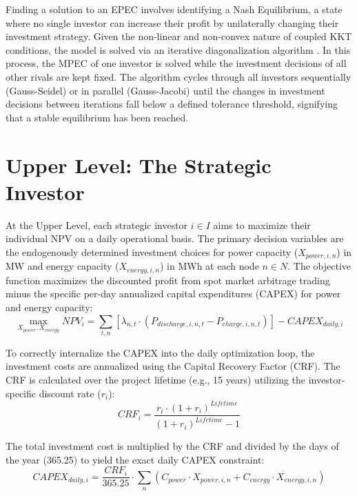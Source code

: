 Finding a solution to an EPEC involves identifying a Nash Equilibrium, a state where no single investor can increase their profit by unilaterally changing their investment strategy. Given the non-linear and non-convex nature of coupled KKT conditions, the model is solved via an iterative diagonalization algorithm \cite{conejo_complementarity_2020}.
In this process, the MPEC of one investor is solved while the investment decisions of all other rivals are kept fixed. The algorithm cycles through all investors sequentially (Gauss-Seidel) or in parallel (Gauss-Jacobi) until the changes in investment decisions between iterations fall below a defined tolerance threshold, signifying that a stable equilibrium has been reached.

\section{Upper Level: The Strategic Investor} \label{sect:Upper_Level}
At the Upper Level, each strategic investor \(i\in I\) aims to maximize their individual NPV on a daily operational basis. The primary decision variables are the endogenously determined investment choices for power capacity (\(X_{power,i,n}\)) in MW and energy capacity (\(X_{energy,i,n}\)) in MWh at each node \(n \in N\).
The objective function maximizes the discounted profit from spot market arbitrage trading minus the specific per-day annualized capital expenditures (CAPEX) for power and energy capacity:
\begin{equation}
        \max_{X_{power}, X_{energy}} NPV_{i} = \sum_{t, n} \left[ \lambda_{n, t} \cdot (P_{discharge, i, n, t} - P_{charge, i, n, t}) \right] - CAPEX_{daily, i}  
\end{equation}

To correctly internalize the CAPEX into the daily optimization loop, the investment costs are annualized using the Capital Recovery Factor (CRF). The CRF is calculated over the project lifetime (e.g., 15 years) utilizing the investor-specific discount rate ($r_i$):
\begin{equation}
    CRF_{i} = \frac{r_i \cdot (1+r_i)^{Lifetime}}{(1+r_i)^{Lifetime} - 1}
\end{equation}

The total investment cost is multiplied by the CRF and divided by the days of the year (365.25) to yield the exact daily CAPEX constraint:
\begin{equation}
    CAPEX_{daily, i} = \frac{CRF_i}{365.25} \cdot \sum_{n} (C_{power} \cdot X_{power, i, n} + C_{energy} \cdot X_{energy, i, n})
\end{equation}

